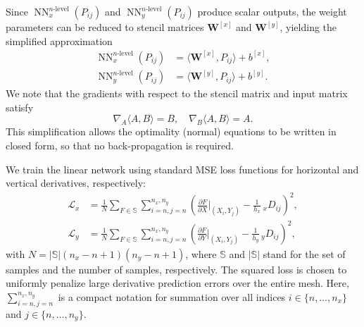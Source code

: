 \documentclass[pdflatex,sn-mathphys-num]{sn-jnl}%
\theoremstyle{thmstyleone}%
\theoremstyle{thmstyletwo}%
\theoremstyle{thmstylethree}%
\begin{document}
Since $\operatorname{NN}^{n\text{-level}}_x(P_{ij})$ and $\operatorname{NN}^{n\text{-level}}_y(P_{ij})$ produce scalar outputs, the weight parameters can be reduced to stencil matrices $\boldsymbol{W}^{[x]}$ and $\boldsymbol{W}^{[y]}$, yielding the simplified approximation
\begin{align*}
\operatorname{NN}^{n\text{-level}}_x(P_{ij}) &= \langle\boldsymbol{W}^{[x]}, P_{ij}\rangle + b^{[x]},\\
\operatorname{NN}^{n\text{-level}}_y(P_{ij}) &= \langle\boldsymbol{W}^{[y]}, P_{ij}\rangle + b^{[y]}.
\end{align*}
 We note that the gradients with respect to the stencil matrix and input matrix satisfy
\[
\nabla_{A}\langle A,B\rangle=B,\quad \nabla_{B}\langle A,B\rangle=A.
\]
This simplification allows the optimality (normal) equations to be written in closed form, so that no back-propagation is required.

We train the linear network using standard MSE loss functions for horizontal and vertical derivatives, respectively:
\begin{align}
\mathcal{L}_x &= \frac{1}{N}\sum_{F\in\mathbb{S}}\sum_{i=n,j=n}^{n_x,n_y} \left( \frac{\partial F}{\partial X}\bigg|_{(X_i,Y_j)} - \frac{1}{h_x}\, {}_x D_{ij} \right)^{\!2},\label{E11}\\
\mathcal{L}_y &= \frac{1}{N}\sum_{F\in\mathbb{S}}\sum_{i=n,j=n}^{n_x,n_y} \left( \frac{\partial F}{\partial Y}\bigg|_{(X_i,Y_j)} - \frac{1}{h_y}\, {}_y D_{ij} \right)^{\!2},\label{E12}
\end{align}
with \(N=|\mathbb{S}|(n_x-n+1)(n_y-n+1)\), where
\(\mathbb{S}\) and \(|\mathbb{S}|\) stand for the set of samples and the number of samples, respectively.
The squared loss is chosen to uniformly penalize large derivative prediction errors over the entire mesh.
Here, $\sum_{i=n,j=n}^{n_x,n_y}$ is a compact notation for summation over all indices $i\in\{n,\dots,n_x\}$ and $j\in\{n,\dots,n_y\}$.
\end{document}
